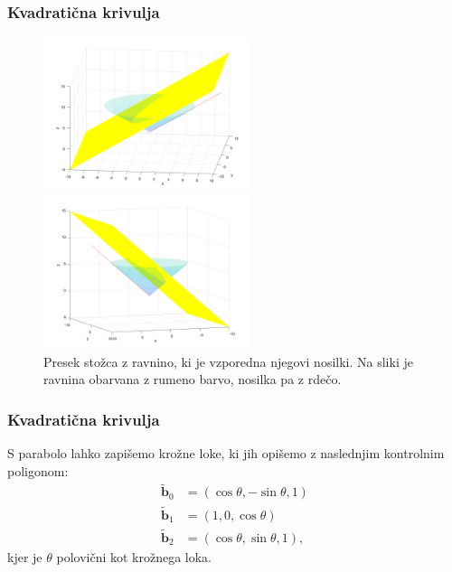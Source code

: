 \documentclass[a4paper, 12pt]{beamer}
\theoremstyle{definition}
\theoremstyle{plain}
\begin{document}
\begin{frame}
\frametitle{Kvadratična krivulja}
    
\begin{figure}[ht!]
    \begin{minipage}{0.5\textwidth}
        \centering
        \includegraphics[width=60mm]{stozec_presek_1.png}
    \end{minipage}\hfill
    \begin{minipage}{0.5\textwidth}
        \centering
        \includegraphics[width=60mm]{stozec_presek_2.png}
    \end{minipage}\hfill
    \caption{Presek stožca z ravnino, ki je vzporedna njegovi nosilki. Na sliki je ravnina obarvana z rumeno barvo, nosilka pa z rdečo.}
\end{figure}
    
\end{frame}
    
    

\begin{frame}
\frametitle{Kvadratična krivulja}
    
    S parabolo lahko zapišemo krožne loke, ki jih opišemo z naslednjim kontrolnim poligonom:
    \begin{align*}
        \boldsymbol{\tilde{b}}_0 &= (\cos{\theta}, -\sin{\theta}, 1)\\
        \boldsymbol{\tilde{b}}_1 &= (1, 0, \cos{\theta})\\
        \boldsymbol{\tilde{b}}_2 &= (\cos \theta, \sin\theta, 1),
    \end{align*}
    kjer je $\theta$ polovični kot krožnega loka. 

    
\end{frame}
    
\end{document}
